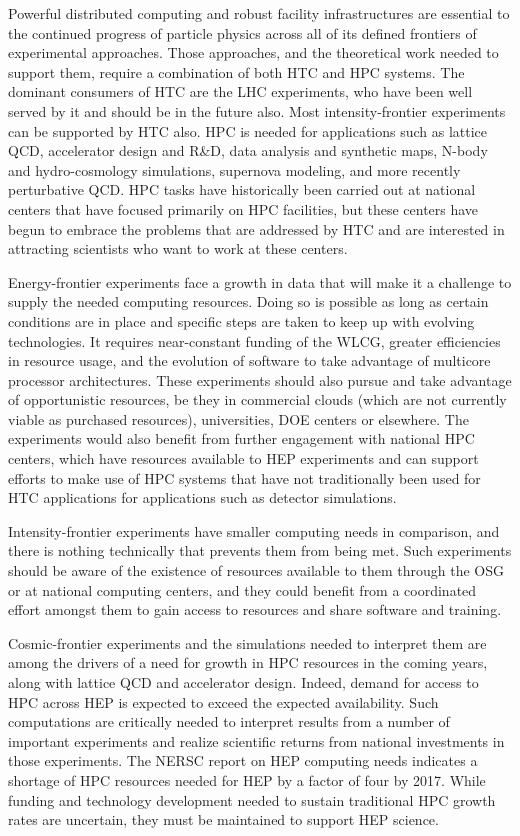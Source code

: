 Powerful distributed computing and robust facility infrastructures are essential to the continued progress of particle physics across all of its defined frontiers of experimental approaches.  Those approaches, and the theoretical work needed to support them, require a combination of both HTC and HPC systems.  The dominant consumers of HTC are the LHC experiments, who have been well served by it and should be in the future also.  Most intensity-frontier experiments can be supported by HTC also.  HPC is needed for applications such as lattice QCD, accelerator design and R\&D, data analysis and synthetic maps, N-body and hydro-cosmology simulations, supernova modeling, and more recently perturbative QCD.  HPC tasks have historically been carried out at national centers that have focused primarily on HPC facilities, but these centers have begun to embrace the problems that are addressed by HTC and are interested in attracting scientists who want to work at these centers.

Energy-frontier experiments face a growth in data that will make it a challenge to supply the needed computing resources.  Doing so is possible as long as certain conditions are in place and specific steps are taken to keep up with evolving technologies.  It requires near-constant funding of the WLCG, greater efficiencies in resource usage, and the evolution of software to take advantage of multicore processor architectures.  These experiments should also pursue and take advantage of opportunistic resources, be they in commercial clouds (which are not currently viable as purchased resources), universities, DOE centers or elsewhere.  The experiments would also benefit from further engagement with national HPC centers, which have resources available to HEP experiments and can support efforts to make use of HPC systems that have not traditionally been used for HTC applications for applications such as detector simulations.

Intensity-frontier experiments have smaller computing needs in comparison, and there is nothing technically that prevents them from being met.  Such experiments should be aware of the existence of resources available to them through the OSG or at national computing centers, and they could benefit from a coordinated effort amongst them to gain access to resources and share software and training.

Cosmic-frontier experiments and the simulations needed to interpret them are among the drivers of a need for growth in HPC resources in the coming years, along with lattice QCD and accelerator design.  Indeed, demand for access to HPC across HEP is expected to exceed the expected availability.  
Such computations are critically needed to interpret results from a number of important experiments and realize scientific returns from national investments in those experiments.  The NERSC report on HEP computing needs indicates a shortage of HPC resources needed for HEP by a factor of four by 2017.  While funding and technology development needed to sustain traditional HPC growth rates are uncertain, they must be maintained to support HEP science.

